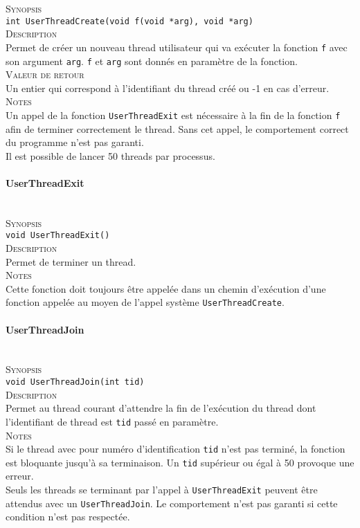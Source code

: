 \documentclass{report}
\newcommand{\myparagraph}[1]{\paragraph*{#1}\mbox{}\\}
\begin{document}
\textsc{Synopsis}\\
	\texttt{int UserThreadCreate(void f(void *arg), void *arg)}\\
	
\textsc{Description}\\
	Permet de créer un nouveau thread utilisateur qui va exécuter la fonction \texttt{f} avec son argument \texttt{arg}. \texttt{f} et \texttt{arg} sont donnés en paramètre de la fonction.\\
	
\textsc{Valeur de retour}\\
	Un entier qui correspond à l'identifiant du thread créé ou -1 en cas d'erreur.\\
	
\textsc{Notes}\\
	Un appel de la fonction \texttt{UserThreadExit} est nécessaire à la fin de la fonction \texttt{f} afin de terminer correctement le thread. Sans cet appel, le comportement correct du programme n'est pas garanti.\\
	Il est possible de lancer 50 threads par processus.

\myparagraph{UserThreadExit}

\textsc{Synopsis}\\
	\texttt{void UserThreadExit()}\\
	
\textsc{Description}\\
	Permet de terminer un thread.\\
	
\textsc{Notes}\\
	Cette fonction doit toujours être appelée dans un chemin d’exécution d'une fonction appelée au moyen de l'appel système \texttt{UserThreadCreate}.
	

\myparagraph{UserThreadJoin}

\textsc{Synopsis}\\
	\texttt{void UserThreadJoin(int tid)}\\
	
\textsc{Description}\\
	Permet au thread courant d'attendre la fin de l'exécution du thread dont l'identifiant de thread est \texttt{tid} passé en paramètre.\\
	
\textsc{Notes}\\
	Si le thread avec pour numéro d'identification \texttt{tid} n'est pas terminé, la fonction est bloquante jusqu'à sa terminaison. Un \texttt{tid} supérieur ou égal à 50 provoque une erreur.\\
Seuls les threads se terminant par l'appel à \texttt{UserThreadExit} peuvent être attendus avec un \texttt{UserThreadJoin}. Le comportement n'est pas garanti si cette condition n'est pas respectée.
\end{document}
